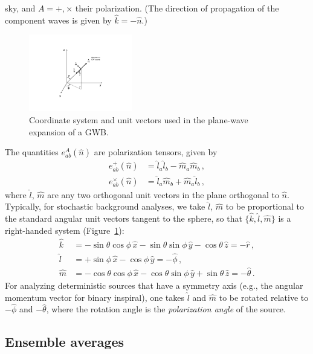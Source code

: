 \documentclass[11pt]{article}
\numberwithin{equation}{section}
\def\be{\begin{equation}}
\def\ee{\end{equation}}
\begin{document}
sky, and $A=+,\times$ their polarization.
(The direction of propagation of the component
waves is given by $\hat k=-\hat n$.)
%
\begin{figure}[htbp!]
\begin{center}
\includegraphics[width=0.4\textwidth]{Figures/plane_wave}
\caption{Coordinate system and unit vectors used in the 
plane-wave expansion of a GWB.}
\label{f:plane_wave}
\end{center}
\end{figure}
%
The quantities $e^A_{ab}(\hat n)$ are polarization
tensors, given by
%
\be
\begin{aligned}
e_{ab}^+(\hat n)
&=\hat l_a\hat l_b-\hat m_a\hat m_b\,,
\\
e_{ab}^\times(\hat n)
&=\hat l_a\hat m_b+\hat m_a\hat l_b\,,
\end{aligned}
\ee
%
where $\hat l$, $\hat m$ are any two orthogonal unit 
vectors in the plane orthogonal to $\hat n$.
Typically, for stochastic background analyses, 
we take $\hat l$, $\hat m$ to be proportional to 
the standard angular unit vectors tangent to the sphere,
so that $\{\hat k, \hat l, \hat m\}$ is a right-handed
system (Figure~\ref{f:plane_wave}):
%
\be
\begin{aligned}
\hat k
&=-\sin\theta\cos\phi\,\hat x
-\sin\theta\sin\phi\,\hat y
-\cos\theta\,\hat z
= -\hat r\,,
\\
\hat l
&=+\sin\phi\,\hat x
-\cos\phi\,\hat y
= -\hat\phi\,,
\\
\hat m
&=-\cos\theta\cos\phi\,\hat x
-\cos\theta\sin\phi\,\hat y
+\sin\theta\,\hat z 
= -\hat\theta\,.
\end{aligned}
\label{e:klm_def}
\ee
%
For analyzing deterministic sources that have 
a symmetry axis (e.g., the angular momentum 
vector for binary inspiral), one takes 
$\hat l$ and $\hat m$ to be rotated relative 
to $-\hat\phi$ and $-\hat\theta$, 
where the rotation angle is the 
{\em polarization angle} of the source.

\subsection{Ensemble averages}
\label{s:ensemble_averages}
\end{document}
